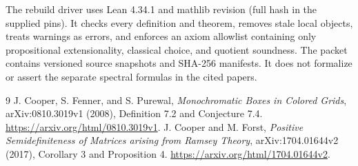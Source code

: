 \documentclass[11pt]{article}
\begin{document}
The rebuild driver uses Lean 4.34.1 and mathlib revision  (full hash in the supplied pins). It checks every definition and theorem, removes stale local objects, treats warnings as errors, and enforces an axiom allowlist containing only propositional extensionality, classical choice, and quotient soundness. The packet contains versioned source snapshots and SHA-256 manifests. It does not formalize or assert the separate spectral formulas in the cited papers.
\begin{thebibliography}{9}
 J. Cooper, S. Fenner, and S. Purewal, \emph{Monochromatic Boxes in Colored Grids}, arXiv:0810.3019v1 (2008), Definition 7.2 and Conjecture 7.4. \url{https://arxiv.org/html/0810.3019v1}.
 J. Cooper and M. Forst, \emph{Positive Semidefiniteness of Matrices arising from Ramsey Theory}, arXiv:1704.01644v2 (2017), Corollary 3 and Proposition 4. \url{https://arxiv.org/html/1704.01644v2}.
\end{thebibliography}
\end{document}
